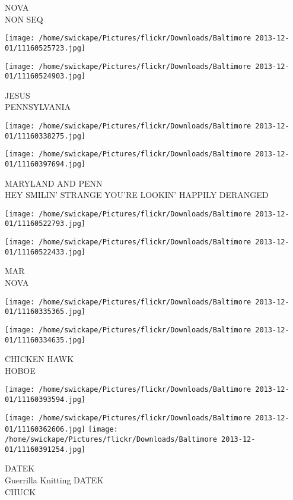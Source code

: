 \documentclass[10pt,letterpaper]{article}
\begin{document}
NOVA\\
NON SEQ
\pagebreak

\texttt{[image: /home/swickape/Pictures/flickr/Downloads/Baltimore 2013-12-01/11160525723.jpg]}

\vspace{0.25in}
\texttt{[image: /home/swickape/Pictures/flickr/Downloads/Baltimore 2013-12-01/11160524903.jpg]}

JESUS\\
PENNSYLVANIA
\pagebreak

\texttt{[image: /home/swickape/Pictures/flickr/Downloads/Baltimore 2013-12-01/11160338275.jpg]}

\vspace{0.25in}
\texttt{[image: /home/swickape/Pictures/flickr/Downloads/Baltimore 2013-12-01/11160397694.jpg]}

MARYLAND AND PENN\\
HEY SMILIN' STRANGE YOU'RE LOOKIN' HAPPILY DERANGED
\pagebreak

\texttt{[image: /home/swickape/Pictures/flickr/Downloads/Baltimore 2013-12-01/11160522793.jpg]}

\vspace{0.25in}
\texttt{[image: /home/swickape/Pictures/flickr/Downloads/Baltimore 2013-12-01/11160522433.jpg]}

MAR\\
NOVA
\pagebreak

\texttt{[image: /home/swickape/Pictures/flickr/Downloads/Baltimore 2013-12-01/11160335365.jpg]}

\vspace{0.25in}
\texttt{[image: /home/swickape/Pictures/flickr/Downloads/Baltimore 2013-12-01/11160334635.jpg]}

CHICKEN HAWK\\
HOBOE
\pagebreak

\texttt{[image: /home/swickape/Pictures/flickr/Downloads/Baltimore 2013-12-01/11160393594.jpg]}

\vspace{0.25in}
\texttt{[image: /home/swickape/Pictures/flickr/Downloads/Baltimore 2013-12-01/11160362606.jpg]}
\texttt{[image: /home/swickape/Pictures/flickr/Downloads/Baltimore 2013-12-01/11160391254.jpg]}

DATEK\\
Guerrilla Knitting DATEK\\
CHUCK
\pagebreak
\end{document}
